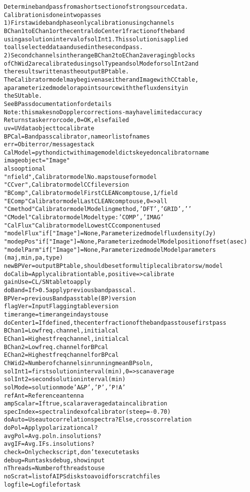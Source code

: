 \begin{boxedminipage}{\textwidth}
\begin{alltt}
Determine bandpass from a short section of strong source data.
Calibration is done in two passes
1)  First a wideband phase only calibration using channels
BChan1 to EChan1 or the central doCenter1 fraction of the band
using a solution interval of solInt1.  This solution is applied
to all selected data and used in the second pass.
2)  Second channels in the range BChan2 to EChan2 averaging blocks
of ChWid2 are calibrated using solType and solMode for solInt2 and
the results written as the output BP table.
   The Calibrator model may be given as either and Image with CC table,
a parameterized model or a point source with the flux density in 
the SU table.
See BPass documentation for details
Note: this makes no Doppler corrections - may have limited accuracy
Returns task error code, 0=OK, else failed
uv       = UV data object to calibrate
BPCal    = Bandpass calibrator, name or list of names
err      = Obit error/message stack
CalModel = python dict with image model dicts keyed on calibrator name
           image object = "Image"
           also optional
           "nfield",    Calibrator model  No. maps to use for model
           "CCver",     Calibrator model CC file version
           "BComp",     Calibrator model First CLEAN comp to use, 1/field
           "EComp"      Calibrator model  Last CLEAN comp to use, 0={\textgreater}all
           "Cmethod"    Calibrator model Modeling method, 'DFT','GRID','    '
           "CModel"     Calibrator model Model type: 'COMP','IMAG'
           "CalFlux"    Calibrator model  Lowest CC component used
           "modelFlux"  if ["Image"]=None, Parameterized model flux density (Jy)
           "modepPos"   if ["Image"]=None, Parameterized model Model position offset (asec)
           "modelParm"  if ["Image"]=None, Parameterized model Model parameters
                        (maj, min, pa, type)
newBPVer = output BP table, should be set for multiple calibrators w/ model
doCalib  = Apply calibration table, positive={\textgreater}calibrate
gainUse  = CL/SN table to apply
doBand   = If {\textgreater}0.5 apply previous bandpass cal.
BPVer    = previous Bandpass table (BP) version
flagVer  = Input Flagging table version
timerange= timerange in days to use
doCenter1= If defined, the center fraction of the bandpass to use first pass
BChan1   = Low freq. channel,  initial cal
EChan1   = Highest freq channel, initial cal
BChan2   = Low freq. channel for BP cal
EChan2   = Highest freq channel for BP cal
ChWid2   = Number of channels in running mean BP soln, 
solInt1  = first solution interval (min), 0={\textgreater} scan average
solInt2  = second solution interval (min)
solMode  = solution mode 'A\&P', 'P', 'P!A'
refAnt   = Reference antenna
ampScalar= If true, scalar average data in calibration
specIndex= spectral index of calibrator (steep=-0.70)
doAuto   = Use autocorrelation spectra? Else, crosscorrelation
doPol    = Apply polarization cal?
avgPol   = Avg. poln. in solutions?
avgIF    = Avg. IFs. in solutions?
check    = Only check script, don't execute tasks
debug    = Run tasks debug, show input
nThreads = Number of threads to use
noScrat  = list of AIPS disks to avoid for scratch files
logfile  = Log file for task\end{alltt}


\end{boxedminipage}
